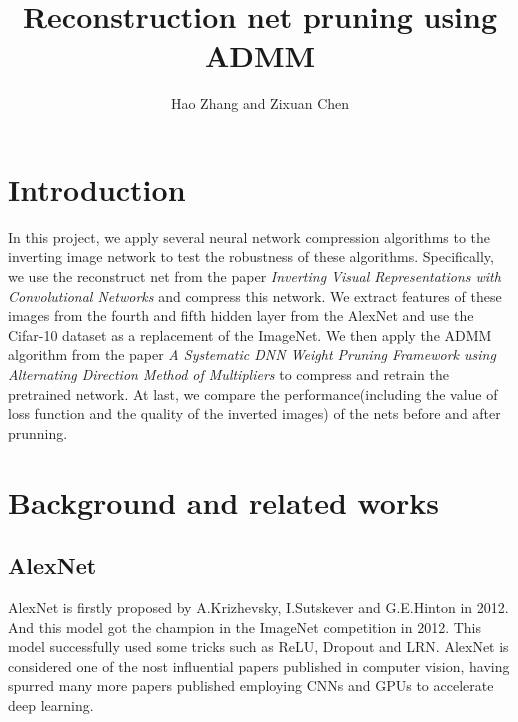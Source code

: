 \documentclass{acmtog} %
\begin{document}

\title{Reconstruction net pruning using ADMM} %

\author{Hao Zhang {\upshape and} Zixuan Chen
}


\maketitle


\section{Introduction}
In this project, we apply several neural network compression algorithms to the inverting image network to test the robustness of these algorithms. Specifically, we use the reconstruct net from the paper \emph{ Inverting Visual Representations with Convolutional Networks} and compress this network. We extract features of these images from the fourth and fifth hidden layer from the AlexNet and use the Cifar-10 dataset as a replacement of the ImageNet. We then apply the ADMM algorithm from the paper \emph{A Systematic DNN Weight Pruning Framework using Alternating Direction Method of Multipliers} to compress and retrain the pretrained network. At last, we compare the performance(including the value of loss function and the quality of the inverted images) of the nets before and after prunning.

\section{Background and related works}
\label{sec:background}
\subsection{AlexNet}

AlexNet is firstly proposed by A.Krizhevsky, I.Sutskever and G.E.Hinton in 2012. And this model got the champion in the ImageNet competition in 2012. This model successfully used some tricks such as ReLU, Dropout and LRN. AlexNet is considered one of the nost influential papers published in computer vision, having spurred many more papers published employing CNNs and GPUs to accelerate deep learning.
\end{document}
